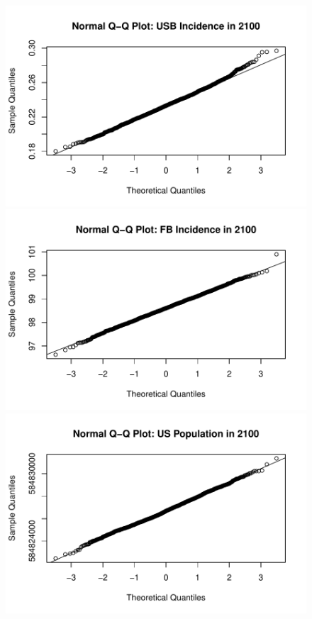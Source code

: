 \documentclass{amsart}
\begin{document}
\begin{figure}
    \includegraphics[scale=0.4]{figures/qqnormUSBInc.pdf}
    \includegraphics[scale=0.4]{figures/qqnormFBInc.pdf}
    \includegraphics[scale=0.4]{figures/qqnormUSBPop.pdf}

\end{figure}
\end{document}
